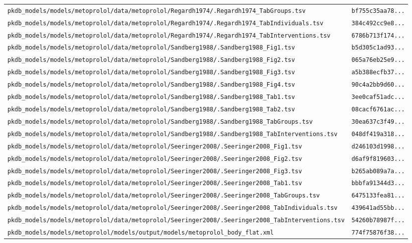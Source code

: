 \documentclass{article}
\begin{document}
\begin{longtable}{ll}
\texttt{pkdb\_models/models/metoprolol/data/metoprolol/Regardh1974/.Regardh1974\_TabGroups.tsv} & \texttt{bf755c35aa78...} \\
\texttt{pkdb\_models/models/metoprolol/data/metoprolol/Regardh1974/.Regardh1974\_TabIndividuals.tsv} & \texttt{384c492cc9e8...} \\
\texttt{pkdb\_models/models/metoprolol/data/metoprolol/Regardh1974/.Regardh1974\_TabInterventions.tsv} & \texttt{6786b713f174...} \\
\texttt{pkdb\_models/models/metoprolol/data/metoprolol/Sandberg1988/.Sandberg1988\_Fig1.tsv} & \texttt{b5d305c1ad93...} \\
\texttt{pkdb\_models/models/metoprolol/data/metoprolol/Sandberg1988/.Sandberg1988\_Fig2.tsv} & \texttt{065a76eb25e9...} \\
\texttt{pkdb\_models/models/metoprolol/data/metoprolol/Sandberg1988/.Sandberg1988\_Fig3.tsv} & \texttt{a5b388ecfb37...} \\
\texttt{pkdb\_models/models/metoprolol/data/metoprolol/Sandberg1988/.Sandberg1988\_Fig4.tsv} & \texttt{90c4a2bb9d60...} \\
\texttt{pkdb\_models/models/metoprolol/data/metoprolol/Sandberg1988/.Sandberg1988\_Tab1.tsv} & \texttt{3ee0caf51adc...} \\
\texttt{pkdb\_models/models/metoprolol/data/metoprolol/Sandberg1988/.Sandberg1988\_Tab2.tsv} & \texttt{08cacf6761ac...} \\
\texttt{pkdb\_models/models/metoprolol/data/metoprolol/Sandberg1988/.Sandberg1988\_TabGroups.tsv} & \texttt{30ea637c3f49...} \\
\texttt{pkdb\_models/models/metoprolol/data/metoprolol/Sandberg1988/.Sandberg1988\_TabInterventions.tsv} & \texttt{048df419a318...} \\
\texttt{pkdb\_models/models/metoprolol/data/metoprolol/Seeringer2008/.Seeringer2008\_Fig1.tsv} & \texttt{d246103d1998...} \\
\texttt{pkdb\_models/models/metoprolol/data/metoprolol/Seeringer2008/.Seeringer2008\_Fig2.tsv} & \texttt{d6af9f819603...} \\
\texttt{pkdb\_models/models/metoprolol/data/metoprolol/Seeringer2008/.Seeringer2008\_Fig3.tsv} & \texttt{b265ab089a7a...} \\
\texttt{pkdb\_models/models/metoprolol/data/metoprolol/Seeringer2008/.Seeringer2008\_Tab1.tsv} & \texttt{bbbfa91344d3...} \\
\texttt{pkdb\_models/models/metoprolol/data/metoprolol/Seeringer2008/.Seeringer2008\_TabGroups.tsv} & \texttt{6475133fea81...} \\
\texttt{pkdb\_models/models/metoprolol/data/metoprolol/Seeringer2008/.Seeringer2008\_TabIndividuals.tsv} & \texttt{439641ad55bb...} \\
\texttt{pkdb\_models/models/metoprolol/data/metoprolol/Seeringer2008/.Seeringer2008\_TabInterventions.tsv} & \texttt{54260b78987f...} \\
\texttt{pkdb\_models/models/metoprolol/models/output/models/metoprolol\_body\_flat.xml} & \texttt{774f75876f38...} \\
\end{longtable}
\end{document}
